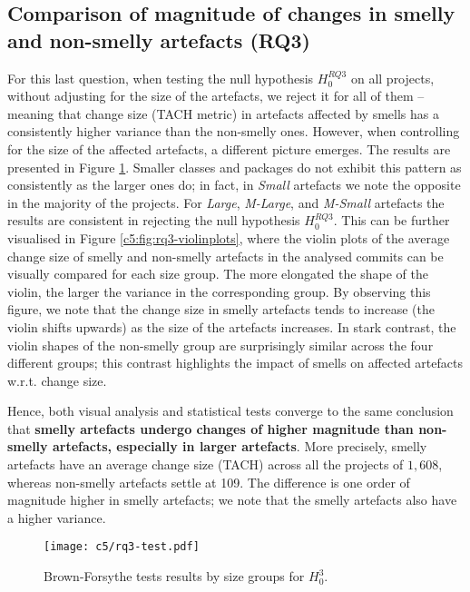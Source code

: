 \subsection{Comparison of magnitude of changes in smelly and non-smelly artefacts (RQ3)}
For this last question, when testing the null hypothesis $H^{RQ3}_0$ on all projects, without adjusting for the size of the artefacts, we reject it for all of them -- meaning that change size (TACH metric) in artefacts affected by smells has a consistently higher variance than the non-smelly ones.
However, when controlling for the size of the affected artefacts, a different picture emerges.
The results are presented in Figure \ref{c5:fig:rq3-test}. 
Smaller classes and packages do not exhibit this pattern as consistently as the larger ones do; in fact, in \emph{Small} artefacts we note the opposite in the majority of the projects.
For \emph{Large}, \emph{M-Large}, and \emph{M-Small} artefacts the results are consistent in rejecting the null hypothesis $H^{RQ3}_0$.
This can be further visualised in Figure \ref{c5:fig:rq3-violinplots}, where the violin plots of the average change size of smelly and non-smelly artefacts in the analysed commits can be visually compared for each size group. The more elongated the shape of the violin, the larger the variance in the corresponding group.
By observing this figure, we note that the change size in smelly artefacts tends to increase (the violin shifts upwards) as the size of the artefacts increases. In stark contrast, the violin shapes of the non-smelly group are surprisingly similar across the four different groups; this contrast highlights the impact of smells on affected artefacts w.r.t. change size. 

Hence, both visual analysis and statistical tests converge to the same conclusion that \textbf{smelly artefacts undergo changes of higher magnitude than non-smelly artefacts, especially in larger artefacts}.
More precisely, smelly artefacts have an average change size (TACH) across all the projects of $1,608$, whereas non-smelly artefacts settle at 109. The difference is one order of magnitude higher in smelly artefacts; we note that the smelly artefacts also have a higher variance.

\begin{figure}
    \centering
    \texttt{[image: c5/rq3-test.pdf]}
    \caption{Brown-Forsythe tests results by size groups for $H_0^3$.}\label{c5:fig:rq3-test}
\end{figure}

